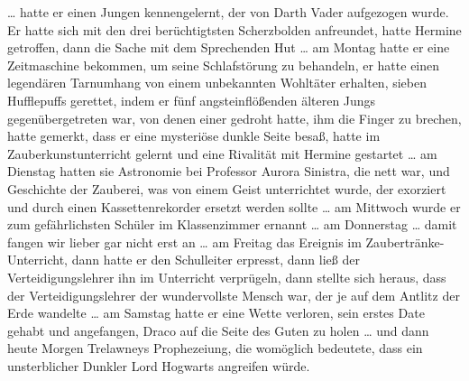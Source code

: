 … hatte er einen Jungen kennengelernt, der von Darth Vader aufgezogen wurde. Er hatte sich mit den drei berüchtigtsten Scherzbolden anfreundet, hatte Hermine getroffen, dann die Sache mit dem Sprechenden Hut … am Montag hatte er eine Zeitmaschine bekommen, um seine Schlafstörung zu behandeln, er hatte einen legendären Tarnumhang von einem unbekannten Wohltäter erhalten, sieben Hufflepuffs gerettet, indem er fünf angsteinflößenden älteren Jungs gegenübergetreten war, von denen einer gedroht hatte, ihm die Finger zu brechen, hatte gemerkt, dass er eine mysteriöse dunkle Seite besaß, hatte im Zauberkunstunterricht  gelernt und eine Rivalität mit Hermine gestartet … am Dienstag hatten sie Astronomie bei Professor Aurora Sinistra, die nett war, und Geschichte der Zauberei, was von einem Geist unterrichtet wurde, der exorziert und durch einen Kassettenrekorder ersetzt werden sollte … am Mittwoch wurde er zum gefährlichsten Schüler im Klassenzimmer ernannt … am Donnerstag … damit fangen wir lieber gar nicht erst an … am Freitag das Ereignis im Zaubertränke-Unterricht, dann hatte er den Schulleiter erpresst, dann ließ der Verteidigungslehrer ihn im Unterricht verprügeln, dann stellte sich heraus, dass der Verteidigungslehrer der wundervollste Mensch war, der je auf dem Antlitz der Erde wandelte … am Samstag hatte er eine Wette verloren, sein erstes Date gehabt und angefangen, Draco auf die Seite des Guten zu holen … und dann heute Morgen Trelawneys Prophezeiung, die womöglich bedeutete, dass ein unsterblicher Dunkler Lord Hogwarts angreifen würde.

